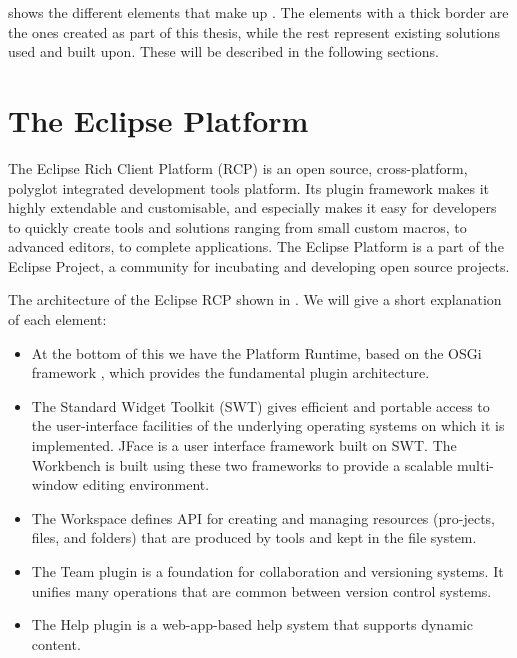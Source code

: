 	
	 shows the different elements that make up \thename{}.
	The elements with a thick border are the ones created as part of this thesis,
	while the rest represent existing solutions used and built upon. These will
	be described in the following sections.

\section{The Eclipse Platform}
The Eclipse Rich Client Platform (RCP) \cite{eclipse} is an open source,
cross-platform, polyglot integrated development tools platform.
Its plugin framework makes it highly extendable and customisable, and
especially makes it easy for developers to quickly create tools and
solutions ranging from small custom macros, to advanced editors, to complete
applications. The Eclipse Platform is a part of the Eclipse Project, a community
for incubating and developing open source projects. 


The architecture of the Eclipse RCP shown in . We will
give a short explanation of each element:

\begin{itemize}
	\item At the bottom of this we have the Platform Runtime, based on the OSGi
	framework \cite{alliance2007osgi}, which provides the fundamental plugin
	architecture.

	\item The Standard Widget Toolkit (SWT) gives efficient and portable access to
	the user-interface facilities of the underlying operating systems on which it is
	implemented. JFace is a user interface framework built on SWT. The Workbench
	is built using these two frameworks to provide a scalable multi-window editing
	environment.
	
	\item The Workspace defines API for creating and managing resources 
	(pro-jects, files, and folders) that are produced by tools and kept in the file
	system.
	
	\item The Team plugin is a foundation for collaboration and versioning systems.
	It unifies many operations that are common between version control systems.
	
	\item The Help plugin is a web-app-based help system that supports dynamic
	content.
\end{itemize}
	
